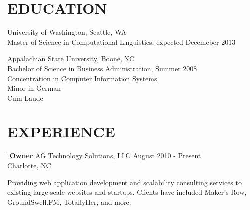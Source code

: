 \documentclass{res}
\begin{document}
 


\address{\large\bf  Anthony Gentile}
\address{6932 Loretta Place \\  Charlotte, NC 28215 \\  (704) 657-8550 \\ asgentile@gmail.com}
                                  
\begin{resume}      
 
\section{EDUCATION}   
    University of Washington, Seattle, WA  \\        
    Master of Science in Computational Linguistics, expected Decemeber 2013
           
    Appalachian State University, Boone, NC  \\        
    Bachelor of Science in Business Administration, Summer 2008   \\       
    Concentration in Computer Information Systems       \\   
    Minor in German  \\        
    Cum Laude

\section{EXPERIENCE}
   \vspace{-0.1in}	
   \begin{tabbing}
   \hspace{2.3in}\= \hspace{2.6in}\= \kill %
    {\bf Owner} \>AG Technology Solutions, LLC     \> August 2010 - Present\\
                             \>Charlotte, NC
   \end{tabbing}\vspace{-5pt}      %
    Providing web application development and scalability consulting services to existing large scale websites and startups. Clients have included Maker's Row, GroundSwell.FM, TotallyHer, and more.
    

\end{resume}
\end{document}
